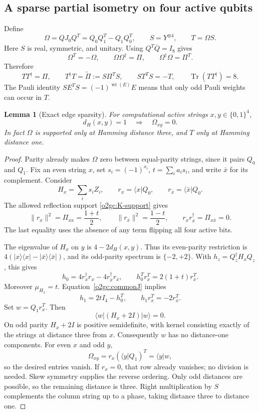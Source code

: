 \documentclass[11pt]{article}
\newcommand{\wt}{\operatorname{wt}}
\newcommand{\ket}[1]{\lvert #1\rangle}
\newcommand{\bra}[1]{\langle #1\rvert}
\newtheorem{lemma}[theorem]{Lemma}
\theoremstyle{definition}
\begin{document}
\subsection{A sparse partial isometry on four active qubits}
\label{o2gc:subsec-T}

Define
\begin{equation}
 \Omega=QJ_0Q^T=Q_0Q_1^T-Q_1Q_0^T,\qquad
 S=Y^{\otimes4},\qquad T=\Omega S.
 \label{o2gc:T-definition}
\end{equation}
Here \(S\) is real, symmetric, and unitary. Using
\(Q^T\overline Q=I_8\) gives
\[
 \Omega^T=-\Omega,\qquad
 \Omega\Omega^\dagger=\Pi,\qquad
 \Omega^\dagger\Omega=\Pi^T.
\]
Therefore
\begin{equation}
 TT^\dagger=\Pi,\qquad
 T^\dagger T=\widetilde\Pi:=S\Pi^TS,\qquad
 ST^TS=-T,\qquad \operatorname{Tr}(TT^\dagger)=8.
 \label{o2gc:partial-isometry}
\end{equation}
The Pauli identity \(SE^TS=(-1)^{\wt(E)}E\) means that only odd
Pauli weights can occur in \(T\).

\begin{lemma}[Exact edge sparsity]
\label{o2gc:lem-edges}
For computational active strings \(x,y\in\{0,1\}^4\),
\[
 d_H(x,y)=1\quad\Longrightarrow\quad\Omega_{xy}=0.
\]
In fact \(\Omega\) is supported only at Hamming distance three, and
\(T\) only at Hamming distance one.
\end{lemma}

\begin{proof}
Parity already makes \(\Omega\) zero between equal-parity strings,
since it pairs \(Q_0\) and \(Q_1\). Fix an even string \(x\), set
\(s_i=(-1)^{x_i}\), \(t=\sum_i a_is_i\), and write \(\bar x\) for
its complement. Consider
\[
 H_x=\sum_i s_iZ_i,\qquad
 r_x=\bra xQ_0,\qquad r_{\bar x}=\bra{\bar x}Q_0.
\]
The allowed reflection support \eqref{o2gc:K-support} gives
\[
 \|r_x\|^2=\Pi_{xx}=\frac{1+t}{2},\qquad
 \|r_{\bar x}\|^2=\frac{1-t}{2},\qquad
 r_xr_{\bar x}^\dagger=\Pi_{x\bar x}=0.
\]
The last equality uses the absence of any term flipping all four
active bits.

The eigenvalue of \(H_x\) on \(y\) is \(4-2d_H(x,y)\). Thus its
even-parity restriction is
\(4(\ket x\bra x-\ket{\bar x}\bra{\bar x})\), and its odd-parity
spectrum is \(\{-2,+2\}\). With \(h_z=Q_z^\dagger H_xQ_z\), this gives
\[
 h_0=4r_x^\dagger r_x-4r_{\bar x}^\dagger r_{\bar x},\qquad
 h_0^Tr_x^T=2(1+t)r_x^T.
\]
Moreover \(\mu_{H_x}=t\). Equation~\eqref{o2gc:commonJ} implies
\[
 h_1=2tI_4-h_0^T,\qquad h_1r_x^T=-2r_x^T.
\]
Set \(w=Q_1r_x^T\). Then
\[
 \bra w(H_x+2I)\ket w=0.
\]
On odd parity \(H_x+2I\) is positive semidefinite, with kernel
consisting exactly of the strings at distance three from \(x\).
Consequently \(w\) has no distance-one components. For even \(x\)
and odd \(y\),
\[
 \Omega_{xy}=r_x(\bra yQ_1)^T=\bra y w,
\]
so the desired entries vanish. If \(r_x=0\), that row already vanishes;
no division is needed. Skew symmetry supplies the reverse ordering.
Only odd distances are possible, so the remaining distance is three.
Right multiplication by \(S\) complements the column string up to a
phase, taking distance three to distance one.
\end{proof}
\end{document}
